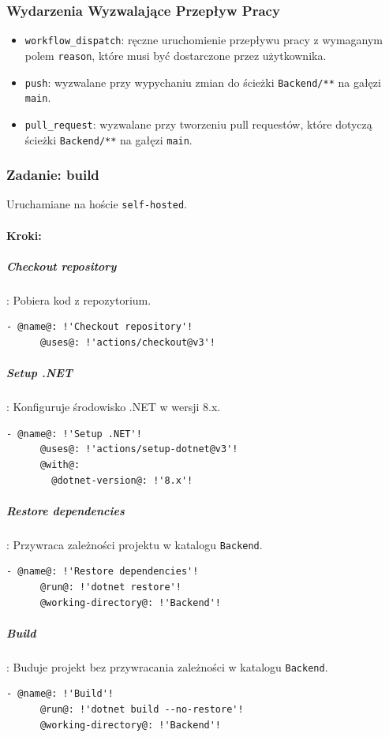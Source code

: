 \subsubsection*{Wydarzenia Wyzwalające Przepływ Pracy}
\begin{itemize}
    \item \texttt{\textcolor{codeblue}{workflow\_dispatch}}: ręczne uruchomienie przepływu pracy z wymaganym polem \texttt{\textcolor{codeblue}{reason}}, które musi być dostarczone przez użytkownika.
    \item \texttt{\textcolor{codeblue}{push}}: wyzwalane przy wypychaniu zmian do ścieżki \texttt{\textcolor{codeblue}{Backend/**}} na gałęzi \texttt{\textcolor{codeblue}{main}}.
    \item \texttt{\textcolor{codeblue}{pull\_request}}: wyzwalane przy tworzeniu pull requestów, które dotyczą ścieżki \texttt{\textcolor{codeblue}{Backend/**}} na gałęzi \texttt{\textcolor{codeblue}{main}}.
\end{itemize}

\subsubsection{Zadanie: build}
Uruchamiane na hoście \texttt{\textcolor{codeblue}{self-hosted}}.
\paragraph{Kroki:}
\subparagraph{Checkout repository}: Pobiera kod z repozytorium.
\begin{lstlisting}[style=yaml-colored]
    - @name@: !'Checkout repository'!
      @uses@: !'actions/checkout@v3'!
\end{lstlisting}

\subparagraph{Setup .NET}: Konfiguruje środowisko .NET w wersji 8.x.
\begin{lstlisting}[style=yaml-colored]
    - @name@: !'Setup .NET'!
      @uses@: !'actions/setup-dotnet@v3'!
      @with@:
        @dotnet-version@: !'8.x'!
\end{lstlisting}

\subparagraph{Restore dependencies}: Przywraca zależności projektu w katalogu \texttt{\textcolor{codeblue}{Backend}}.
\begin{lstlisting}[style=yaml-colored]
    - @name@: !'Restore dependencies'!
      @run@: !'dotnet restore'!
      @working-directory@: !'Backend'!
\end{lstlisting}

\subparagraph{Build}: Buduje projekt bez przywracania zależności w katalogu \texttt{\textcolor{codeblue}{Backend}}.
\begin{lstlisting}[style=yaml-colored]
    - @name@: !'Build'!
      @run@: !'dotnet build --no-restore'!
      @working-directory@: !'Backend'!
\end{lstlisting}

